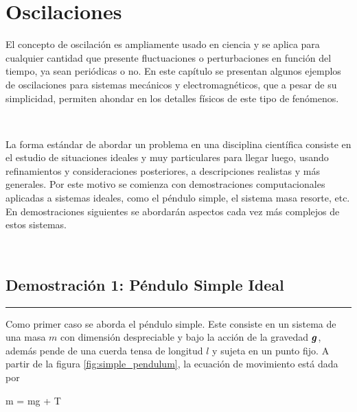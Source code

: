 \chapter{Oscilaciones}
\label{cha:oscillations}

El concepto de oscilación es ampliamente usado en ciencia y se aplica para
cualquier cantidad que presente fluctuaciones o perturbaciones en función 
del tiempo, ya sean periódicas o no. En este capítulo se presentan algunos
ejemplos de oscilaciones para sistemas mecánicos y electromagnéticos, que 
a pesar de su simplicidad, permiten ahondar en los detalles físicos de este
tipo de fenómenos.

\

La forma estándar de abordar un problema en una disciplina científica 
consiste en el estudio de situaciones ideales y muy particulares para llegar 
luego, usando refinamientos y consideraciones posteriores, a descripciones 
realistas y más generales. Por este motivo se comienza con demostraciones 
computacionales aplicadas a sistemas ideales, como el péndulo simple, el 
sistema masa resorte, etc. En demostraciones siguientes se abordarán 
aspectos cada vez más complejos de estos sistemas.



\
\section{Demostración 1: Péndulo Simple Ideal}
\label{sec:DEMO2_01}
\rule{14cm}{0.5mm}

Como primer caso se aborda el péndulo simple. Este consiste en un sistema
de una masa $m$ con dimensión despreciable y bajo la acción de la 
gravedad $\boldsymbol{ g }$, además pende de una cuerda tensa de longitud $l$ y sujeta
en un punto fijo. A partir de la figura \ref{fig:simple_pendulum}, la 
ecuación de movimiento está dada por


{m = m\bds g + \bds T}

